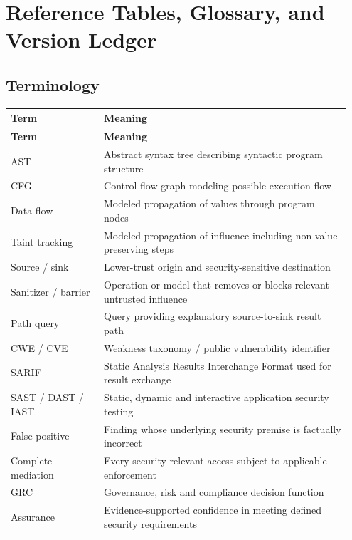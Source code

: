 \documentclass[11pt,letterpaper,oneside]{book}
\begin{document}
\chapter{Reference Tables, Glossary, and Version Ledger}

\section{Terminology}

\small
\setlength{\tabcolsep}{2pt}
\renewcommand{\arraystretch}{1.18}
\begin{longtable}{>{\raggedright\arraybackslash}p{0.26\linewidth}>{\raggedright\arraybackslash}p{0.69\linewidth}}
\toprule
\textbf{Term} & \textbf{Meaning}\\
\midrule
\endfirsthead
\toprule
\textbf{Term} & \textbf{Meaning}\\
\midrule
\endhead
AST & Abstract syntax tree describing syntactic program structure\\
CFG & Control-flow graph modeling possible execution flow\\
Data flow & Modeled propagation of values through program nodes\\
Taint tracking & Modeled propagation of influence including non-value-preserving steps\\
Source / sink & Lower-trust origin and security-sensitive destination\\
Sanitizer / barrier & Operation or model that removes or blocks relevant untrusted influence\\
Path query & Query providing explanatory source-to-sink result path\\
CWE / CVE & Weakness taxonomy / public vulnerability identifier\\
SARIF & Static Analysis Results Interchange Format used for result exchange\\
SAST / DAST / IAST & Static, dynamic and interactive application security testing\\
False positive & Finding whose underlying security premise is factually incorrect\\
Complete mediation & Every security-relevant access subject to applicable enforcement\\
GRC & Governance, risk and compliance decision function\\
Assurance & Evidence-supported confidence in meeting defined security requirements\\
\bottomrule
\end{longtable}
\normalsize
\end{document}
